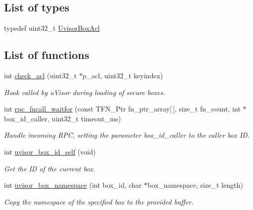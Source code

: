 \subsection*{List of types}
\begin{DoxyCompactItemize}
\item
typedef uint32\+\_\+t \hyperlink{group__hypervisor_ga1527b3a7e3df3007490669cbd26b4fe9}{Uvisor\+Box\+Acl}
\end{DoxyCompactItemize}
\subsection*{List of functions}
\begin{DoxyCompactItemize}
\item
int \hyperlink{group__hypervisor_ga6e7f7b03367daefa2cbcb7e4f0538ba7}{check\+\_\+acl} (uint32\+\_\+t $\ast$p\+\_\+acl, uint32\+\_\+t keyindex)
\begin{DoxyCompactList}\small\item\em Hook called by u\+Visor during loading of secure boxes. \end{DoxyCompactList}\item
int \hyperlink{group__hypervisor_gafdaf52538986a558e934eab65221731e}{rpc\+\_\+fncall\+\_\+waitfor} (const T\+F\+N\+\_\+\+Ptr fn\+\_\+ptr\+\_\+array\mbox{[}$\, $\mbox{]}, size\+\_\+t fn\+\_\+count, int $\ast$box\+\_\+id\+\_\+caller, uint32\+\_\+t timeout\+\_\+ms)
\begin{DoxyCompactList}\small\item\em Handle incoming R\+PC, setting the parameter box\+\_\+id\+\_\+caller to the caller box ID. \end{DoxyCompactList}\item
int \hyperlink{group__hypervisor_gab099ca7d08f626791039573dbff14af5}{uvisor\+\_\+box\+\_\+id\+\_\+self} (void)
\begin{DoxyCompactList}\small\item\em Get the ID of the current box. \end{DoxyCompactList}\item
int \hyperlink{group__hypervisor_gab605e738e6bc828cd9efb6eacca79685}{uvisor\+\_\+box\+\_\+namespace} (int box\+\_\+id, char $\ast$box\+\_\+namespace, size\+\_\+t length)
\begin{DoxyCompactList}\small\item\em Copy the namespace of the specified box to the provided buffer. \end{DoxyCompactList}\item

\end{DoxyCompactItemize}
